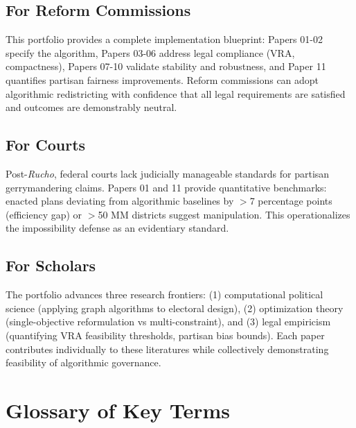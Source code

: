 \documentclass[11pt]{article}
\begin{document}
\subsection*{For Reform Commissions}
This portfolio provides a complete implementation blueprint: Papers 01-02 specify the algorithm, Papers 03-06 address legal compliance (VRA, compactness), Papers 07-10 validate stability and robustness, and Paper 11 quantifies partisan fairness improvements. Reform commissions can adopt algorithmic redistricting with confidence that all legal requirements are satisfied and outcomes are demonstrably neutral.

\subsection*{For Courts}
Post-\emph{Rucho}, federal courts lack judicially manageable standards for partisan gerrymandering claims. Papers 01 and 11 provide quantitative benchmarks: enacted plans deviating from algorithmic baselines by $>$7 percentage points (efficiency gap) or $>$50 MM districts suggest manipulation. This operationalizes the impossibility defense as an evidentiary standard.

\subsection*{For Scholars}
The portfolio advances three research frontiers: (1) computational political science (applying graph algorithms to electoral design), (2) optimization theory (single-objective reformulation vs multi-constraint), and (3) legal empiricism (quantifying VRA feasibility thresholds, partisan bias bounds). Each paper contributes individually to these literatures while collectively demonstrating feasibility of algorithmic governance.

\section*{Glossary of Key Terms}
\end{document}
